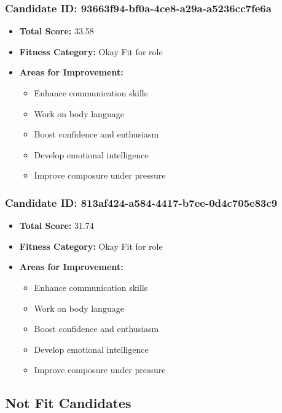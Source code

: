 \documentclass{article}
\begin{document}
\subsubsection{Candidate ID: 93663f94-bf0a-4ce8-a29a-a5236cc7fe6a}
\begin{itemize}
    \item \textbf{Total Score:} 33.58
    \item \textbf{Fitness Category:} Okay Fit for role
    \item \textbf{Areas for Improvement:}
    \begin{itemize}
        \item Enhance communication skills
        \item Work on body language
        \item Boost confidence and enthusiasm
        \item Develop emotional intelligence
        \item Improve composure under pressure
    \end{itemize}
\end{itemize}

\subsubsection{Candidate ID: 813af424-a584-4417-b7ee-0d4c705e83c9}
\begin{itemize}
    \item \textbf{Total Score:} 31.74
    \item \textbf{Fitness Category:} Okay Fit for role
    \item \textbf{Areas for Improvement:}
    \begin{itemize}
        \item Enhance communication skills
        \item Work on body language
        \item Boost confidence and enthusiasm
        \item Develop emotional intelligence
        \item Improve composure under pressure
    \end{itemize}
\end{itemize}

\subsection{Not Fit Candidates}
\end{document}
